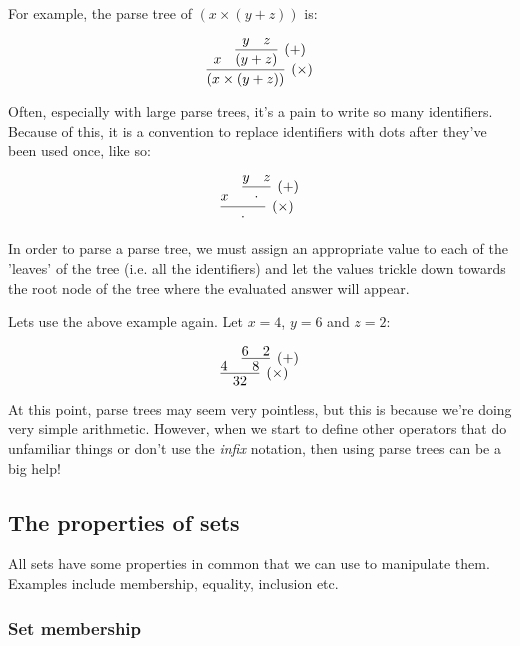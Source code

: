 For example, the parse tree of $(x \times (y + z))$ is:


\begin{dmath}
	\infer[(\times)]{(x \times (y + z))}{
		x
		&
		\infer[(+)]{(y + z)}{
			y
			&
			z
		}
	}
\end{dmath}

Often, especially with large parse trees, it's a pain to write so many
identifiers. Because of this, it is a convention to replace identifiers with
dots after they've been used once, like so:

\begin{dmath}
	\infer[(\times)]{\parsetreedot} {
		x
		&
		\infer[(+)]{\parsetreedot} {
			y
			&
			z
		}
	}
\end{dmath}

In order to parse a parse tree, we must assign an appropriate value to each of
the 'leaves' of the tree (i.e. all the identifiers) and let the values trickle
down towards the root node of the tree where the evaluated answer will appear.

Lets use the above example again. Let $x = 4$, $y = 6$ and $z = 2$:

\begin{dmath}
	\infer[(\times)]{32} {
		4
		&
		\infer[(+)]{8} {
			6
			&
			2
		}
	}
\end{dmath}


At this point, parse trees may seem very pointless, but this is because we're
doing very simple arithmetic. However, when we start to define other operators
that do unfamiliar things or don't use the {\it infix} notation,
then using parse trees can be a big help!

\subsection{The properties of sets}
\label{subsec:properties_of_sets}

All sets have some properties in common that we can use to manipulate them.
Examples include membership, equality, inclusion etc.

\subsubsection{Set membership}

